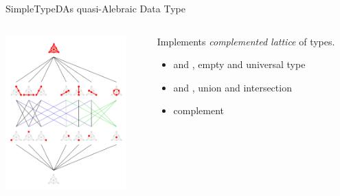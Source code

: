 \begin{frame}{SimpleTypeD}{As quasi-Alebraic Data Type}

  \begin{columns}

    \begin{column}{0.4\textwidth}
  
      \includegraphics[height=6cm]{Fano_plane_Hasse_diagram} 
    \end{column}
    \begin{column}{0.6\textwidth}%
      Implements \emph{complemented lattice} of types.

      \medskip
      
  \begin{itemize}
  \item {} and , empty and universal type
  \item {} and , union and intersection
  \item {} complement
  \end{itemize}
      
    \end{column}
  \end{columns}
  
\end{frame}

\newsavebox\adtbox
\begin{lrbox}{\adtbox}
  \begin{minipage}{11cm}
    
  \end{minipage}
\end{lrbox}






